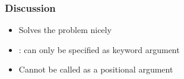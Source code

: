 \documentclass[14pt,compress]{beamer}
\begin{document}
\begin{frame}
  \frametitle{Discussion}
  \begin{itemize}
  \item Solves the problem nicely
  \item {}: can only be specified as keyword argument

  \item Cannot be called as a positional argument
  \end{itemize}
\end{frame}
\end{document}
